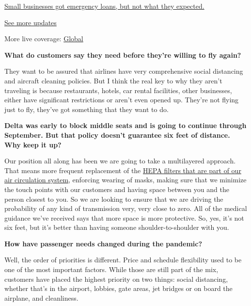 \href{https://www.nytimes3xbfgragh.onion/live/2020/08/03/business/stock-market-today-coronavirus?action=click\&pgtype=Article\&state=default\&region=MAIN_CONTENT_1\&context=storylines_live_updates\#small-businesses-got-emergency-loans-but-not-what-they-expected}{Small
businesses got emergency loans, but not what they expected.}

\href{https://www.nytimes3xbfgragh.onion/live/2020/08/03/business/stock-market-today-coronavirus?action=click\&pgtype=Article\&state=default\&region=MAIN_CONTENT_1\&context=storylines_live_updates}{See
more updates}

More live coverage:
\href{https://www.nytimes3xbfgragh.onion/2020/08/03/world/coronavirus-covid-19.html?action=click\&pgtype=Article\&state=default\&region=MAIN_CONTENT_1\&context=storylines_live_updates}{Global}

\textbf{What do customers say they need before they're willing to fly
again?}

They want to be assured that airlines have very comprehensive social
distancing and aircraft cleaning policies. But I think the real key to
why they aren't traveling is because restaurants, hotels, car rental
facilities, other businesses, either have significant restrictions or
aren't even opened up. They're not flying just to fly, they've got
something that they want to do.

\textbf{Delta was early to block middle seats and is going to continue
through September. But that policy doesn't guarantee six feet of
distance. Why keep it up?}

Our position all along has been we are going to take a multilayered
approach. That means more frequent replacement of the
\href{https://www.nytimes3xbfgragh.onion/2020/04/30/business/airlines-masks-coronavirus-passengers.html}{HEPA
filters that are part of our air circulation system}, enforcing wearing
of masks, making sure that we minimize the touch points with our
customers and having space between you and the person closest to you. So
we are looking to ensure that we are driving the probability of any kind
of transmission very, very close to zero. All of the medical guidance
we've received says that more space is more protective. So, yes, it's
not six feet, but it's better than having someone shoulder-to-shoulder
with you.

\textbf{How have passenger needs changed during the pandemic?}

Well, the order of priorities is different. Price and schedule
flexibility used to be one of the most important factors. While those
are still part of the mix, customers have placed the highest priority on
two things: social distancing, whether that's in the airport, lobbies,
gate areas, jet bridges or on board the airplane, and cleanliness.

